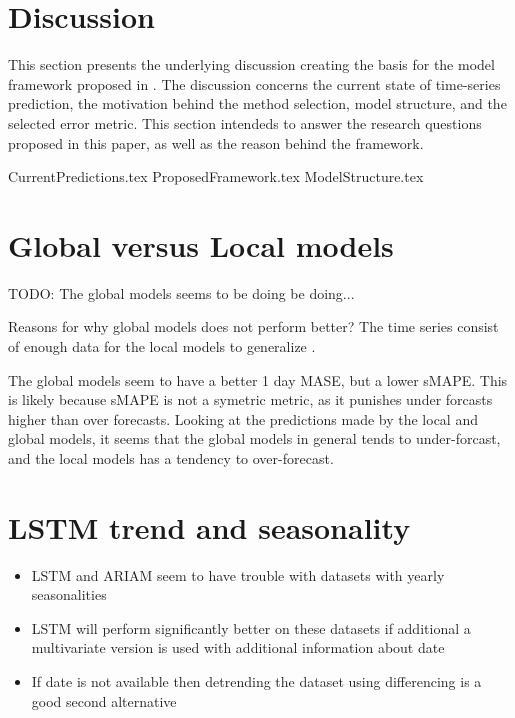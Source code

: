 
\section{Discussion}
\label{section:Discussion:Discussion}


This section presents the underlying discussion creating the basis for the model framework proposed in .
The discussion concerns the current state of time-series prediction, the motivation behind the method selection, model structure, and the selected error metric.
This section intendeds to answer the research questions proposed in this paper,
as well as the reason behind the framework.


{CurrentPredictions.tex}
{ProposedFramework.tex}
{ModelStructure.tex}

\section{Global versus Local models}
TODO:
The global models seems to be doing be doing...

Reasons for why global models does not perform better?
The time series consist of enough data for the local models to generalize
\cite{Montero-Manso2021}.

The global models seem to have a better 1 day MASE, but a lower sMAPE.
This is likely because sMAPE is not a symetric metric, as it punishes
under forcasts higher than over forecasts. Looking at the predictions made by
the local and global models, it seems that the global models in general tends to
under-forcast, and the local models has a tendency to over-forecast.

\section{LSTM trend and seasonality}
\begin{itemize}
  \item LSTM and ARIAM seem to have trouble with datasets with yearly seasonalities
  \item {LSTM will perform significantly better on these datasets if additional
        a multivariate version is used with additional information about date}
  \item {If date is not available then detrending the dataset using differencing is a good second alternative}
\end{itemize}


